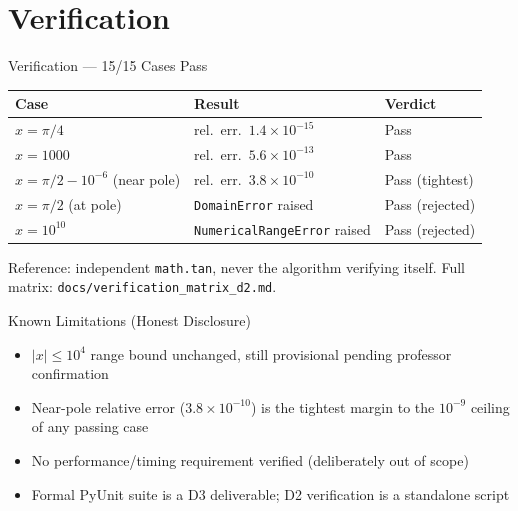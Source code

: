 \documentclass[10pt]{beamer}
\begin{document}
\section{Verification}
\begin{frame}{Verification --- 15/15 Cases Pass}
  \begin{table}
    \small
    \begin{tabular}{lll}
      \toprule
      Case & Result & Verdict \\
      \midrule
      $x=\pi/4$ & rel.\ err.\ $1.4\times10^{-15}$ & Pass \\
      $x=1000$ & rel.\ err.\ $5.6\times10^{-13}$ & Pass \\
      $x=\pi/2-10^{-6}$ (near pole) & rel.\ err.\ $3.8\times10^{-10}$ & Pass (tightest) \\
      $x=\pi/2$ (at pole) & \texttt{DomainError} raised & Pass (rejected) \\
      $x=10^{10}$ & \texttt{NumericalRangeError} raised & Pass (rejected) \\
      \bottomrule
    \end{tabular}
  \end{table}
  Reference: independent \texttt{math.tan}, never the algorithm verifying itself. Full matrix: \texttt{docs/verification\_matrix\_d2.md}.
\end{frame}

\begin{frame}{Known Limitations (Honest Disclosure)}
  \begin{itemize}
    \item $|x|\le10^4$ range bound unchanged, still provisional pending professor confirmation
    \item Near-pole relative error ($3.8\times10^{-10}$) is the tightest margin to the $10^{-9}$ ceiling of any passing case
    \item No performance/timing requirement verified (deliberately out of scope)
    \item Formal PyUnit suite is a D3 deliverable; D2 verification is a standalone script
  \end{itemize}
\end{frame}
\end{document}
